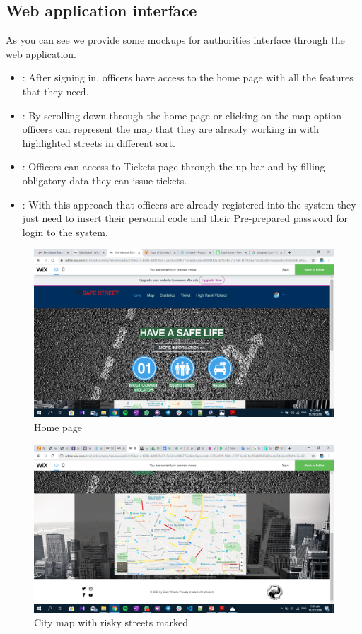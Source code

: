 \documentclass{article}
\begin{document}
	\subsection{Web application interface}
	As you can see we provide some mockups for authorities interface through the web application.
	\begin{itemize}
	\item {} : After signing in, officers have access to the home page with all the features that they need.
	\item {} : By scrolling down through the home page or clicking on the map option officers can represent the map that they are already working in with highlighted streets in different sort.
	\item {} : Officers can access to Tickets page through the up bar and by filling obligatory data they can issue tickets.
	\item {} : With this approach that officers are already registered into the system they just need to insert their personal code and their Pre-prepared password for login to the system.
	\end {itemize}
		\begin{figure}[h]
			\includegraphics[width=\linewidth]{images/home.png}
			\caption{Home page}
			\label{fig:web_homepage}
		\end{figure}
		\begin{figure}[h]
			\includegraphics[width=\linewidth]{images/map.png}
			\caption{City map with risky streets marked}
			\label{fig:web_map}
		\end{figure}
\end{document}
